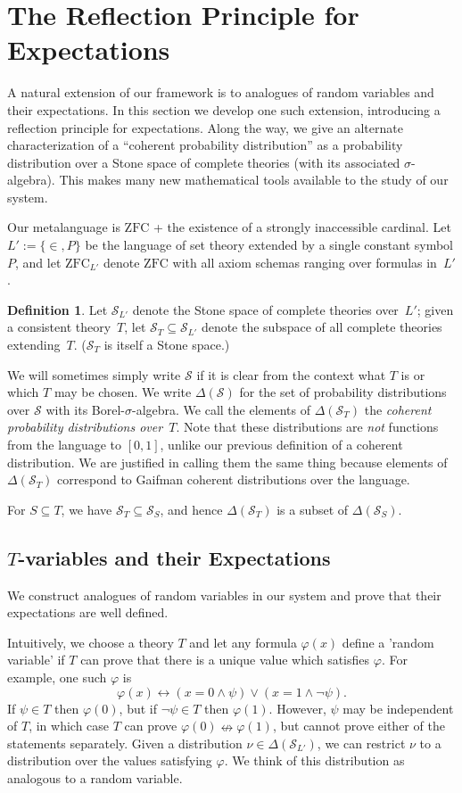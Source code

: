 \documentclass[12pt]{article}
\newcommand{\vp}{\varphi}
\newcommand{\zfc}{\mathrm{ZFC}}
\newcommand{\zfcl}{{\zfc_{\cL}}}
\newcommand{\cSL}{{\cS_{\cL}}}
\newcommand{\cL}{L'}
\newcommand{\cS}{\mathcal{S}}
\newcommand{\Tvar}{$T$-variable}
\theoremstyle{plain}
\theoremstyle{definition}
\newtheorem{definition}[theorem]{Definition}
\theoremstyle{remark}
\begin{document}
\section{The Reflection Principle for Expectations}
\label{refl-exp}
A natural extension of our framework is to analogues of random variables and their expectations. 
In this section we develop one such extension, introducing a reflection principle for expectations.
Along the way, we give an alternate characterization of a ``coherent probability distribution'' as a probability distribution over a Stone space of complete theories (with its associated $\sigma$-algebra). This makes many new mathematical tools available to the study of our system.

Our metalanguage is $\zfc$ + the existence of a strongly inaccessible cardinal.
Let $\cL := \{\in,P\}$ be the language of set theory extended by a single constant symbol $P$, and let $\zfcl$ denote $\zfc$ with all axiom schemas ranging over formulas in~$\cL$.
\begin{definition}
Let $\cSL$ denote the Stone space of complete theories over~$\cL$; given a consistent theory~$T$, let $\cS_T\subseteq\cSL$ denote the subspace of all complete theories extending~$T$. ($\cS_T$ is itself a Stone space.) 

We will sometimes simply write $\cS$ if it is clear from the context what $T$ is or which $T$ may be chosen.
We write $\Delta(\cS)$ for the set of probability distributions over $\cS$ with its Borel-$\sigma$-algebra.
We call the elements of $\Delta(\cS_T)$ the \emph{coherent probability distributions over~$T$}. 
Note that these distributions are \emph{not} functions from the language to $[0,1]$, unlike our previous definition of a coherent distribution. 
We are justified in calling them the same thing because elements of $\Delta(\cS_T)$ correspond to Gaifman coherent distributions over the language.
\end{definition}
For $S\subseteq T$, we have $\cS_T\subseteq\cS_S$, and hence $\Delta(\cS_T)$ is a subset of $\Delta(\cS_S)$.
\subsection{\Tvar{}s and their Expectations}
We construct analogues of random variables in our system and prove that their expectations are well defined.

Intuitively, we choose a theory $T$ and let any formula $\vp(x)$ define a 'random variable' if $T$ can prove that there is a unique value which satisfies $\vp$. For example, one such $\vp$ is
$$\vp(x) \leftrightarrow (x = 0 \wedge \psi) \vee (x = 1 \wedge \neg \psi).$$
If $\psi\in T$ then $\vp(0)$, but if $\neg \psi\in T$ then $\vp(1)$. 
However, $\psi$ may be independent of $T$, in which case $T$ can prove $\vp(0) \nleftrightarrow \vp(1)$, but cannot prove either of the statements separately.
Given a distribution $\nu\in \Delta(\cSL)$, we can restrict $\nu$ to a distribution over the values satisfying $\vp$.
We think of this distribution as analogous to a random variable.
\end{document}
